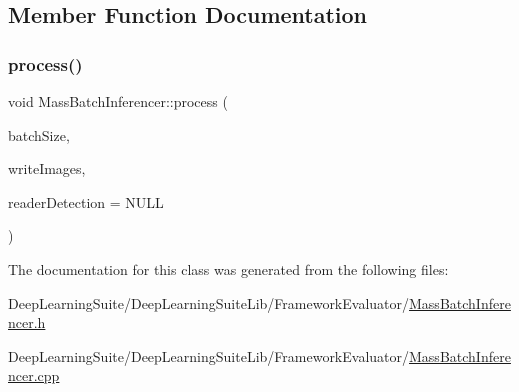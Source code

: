 \subsection{Member Function Documentation}
\mbox{\label{class_mass_batch_inferencer_aeebcf30a5d03aac850f021d8f0ea5767}} 
\subsubsection{\texorpdfstring{process()}{process()}}
{\footnotesize\ttfamily void Mass\+Batch\+Inferencer\+::process (\begin{DoxyParamCaption}\item[{const int}]{batch\+Size,  }\item[{bool}]{write\+Images,  }\item[{\hyperlink{_dataset_reader_8h_a30d89cba514a220d64d04535c0465f1c}{Dataset\+Reader\+Ptr}}]{reader\+Detection = {\ttfamily NULL} }\end{DoxyParamCaption})}



The documentation for this class was generated from the following files\+:\begin{DoxyCompactItemize}
\item 
Deep\+Learning\+Suite/\+Deep\+Learning\+Suite\+Lib/\+Framework\+Evaluator/\hyperlink{_mass_batch_inferencer_8h}{Mass\+Batch\+Inferencer.\+h}\item 
Deep\+Learning\+Suite/\+Deep\+Learning\+Suite\+Lib/\+Framework\+Evaluator/\hyperlink{_mass_batch_inferencer_8cpp}{Mass\+Batch\+Inferencer.\+cpp}\end{DoxyCompactItemize}
